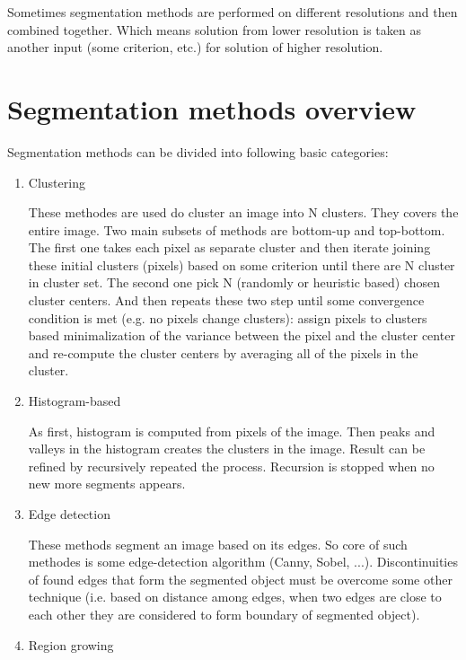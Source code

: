 Sometimes segmentation methods are performed on different resolutions and then combined together.
Which means solution from lower resolution is taken as another input (some criterion, etc.) for solution of higher resolution.

\section{Segmentation methods overview}

Segmentation methods can be divided into following basic categories:

\begin{enumerate}

  \item Clustering

  These methodes are used do cluster an image into N clusters.
They covers the entire image.
Two main subsets of methods are bottom-up and top-bottom.
The first one takes each pixel as separate cluster and then iterate joining these initial clusters (pixels) based on some criterion until there are N cluster in cluster set.
The second one pick N (randomly or heuristic based) chosen cluster centers.
And then repeats these two step until some convergence condition is met (e.g. no pixels change clusters): assign pixels to clusters based minimalization of the variance between the pixel and the cluster center and re-compute the cluster centers by averaging all of the pixels in the cluster.

  \item Histogram-based

  As first, histogram is computed from pixels of the image.
Then peaks and valleys in the histogram creates the clusters in the image.
Result can be refined by recursively repeated the process.
Recursion is stopped when no new more segments appears.

  \item Edge detection

  These methods segment an image based on its edges.
So core of such methodes is some edge-detection algorithm (Canny, Sobel, ...).
Discontinuities of found edges that form the segmented object must be overcome some other technique (i.e. based on distance among edges, when two edges are close to each other they are considered to form boundary of segmented object).

  \item Region growing


\end{enumerate}
